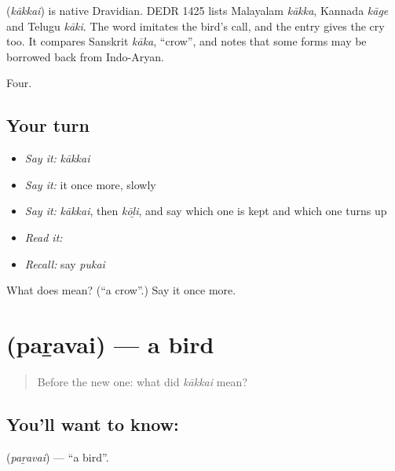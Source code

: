 \begin{cousinweb}
\textbf{} (\emph{kākkai}) is native Dravidian. DEDR 1425 lists Malayalam \emph{kākka}, Kannada \emph{kāge} and Telugu \emph{kāki}. The word imitates the bird's call, and the entry gives the cry too. It compares Sanskrit \emph{kāka}, \textquotedblleft{}crow\textquotedblright{}, and notes that some forms may be borrowed back from Indo-Aryan.
\end{cousinweb}

\begin{grammarlens}[title={What you've built}]
Four.
\end{grammarlens}

\subsection*{Your turn}
\begin{itemize}
\raggedright
  \item \emph{Say it:} \emph{kākkai}
  \item \emph{Say it:} it once more, slowly
  \item \emph{Say it:} \emph{kākkai}, then \emph{kōḻi}, and say which one is kept and which one turns up
  \item \emph{Read it:} \textbf{}
  \item \emph{Recall:} say \emph{pukai}
\end{itemize}

\begin{tcolorbox}[breakable,colback=teal!4,colframe=teal!35!black,title={Before you move on}]
What does  mean? (\textquotedblleft{}a crow\textquotedblright{}.) Say it once more.
\end{tcolorbox}
\section[\texorpdfstring{\ta{பறவை} (paṟavai)}{பறவை (paṟavai)}]{ (paṟavai) — a bird}

\label{lesson:TA-C58-bird}



\begin{quote}
Before the new one: what did \emph{kākkai} mean?
\end{quote}

\subsection*{You'll want to know: }
\textbf{} (\emph{paṟavai}) — \textquotedblleft{}a bird\textquotedblright{}.

